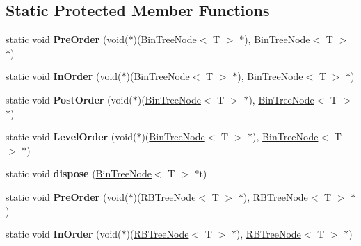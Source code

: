 \subsection*{Static Protected Member Functions}
\begin{DoxyCompactItemize}
\item 
\mbox{\label{classLinkedBinaryTree_afe666629aa48b0b728d3868a604a4edd}} 
static void {\bfseries Pre\+Order} (void($\ast$)(\hyperlink{structBinTreeNode}{Bin\+Tree\+Node}$<$ T $>$ $\ast$), \hyperlink{structBinTreeNode}{Bin\+Tree\+Node}$<$ T $>$ $\ast$)
\item 
\mbox{\label{classLinkedBinaryTree_aad48962cf15c42729050432724c84f7d}} 
static void {\bfseries In\+Order} (void($\ast$)(\hyperlink{structBinTreeNode}{Bin\+Tree\+Node}$<$ T $>$ $\ast$), \hyperlink{structBinTreeNode}{Bin\+Tree\+Node}$<$ T $>$ $\ast$)
\item 
\mbox{\label{classLinkedBinaryTree_ae68892b9b41f1319cdce9be8960cdb25}} 
static void {\bfseries Post\+Order} (void($\ast$)(\hyperlink{structBinTreeNode}{Bin\+Tree\+Node}$<$ T $>$ $\ast$), \hyperlink{structBinTreeNode}{Bin\+Tree\+Node}$<$ T $>$ $\ast$)
\item 
\mbox{\label{classLinkedBinaryTree_a167c6b7159236f1d143e4a7bf8cd2548}} 
static void {\bfseries Level\+Order} (void($\ast$)(\hyperlink{structBinTreeNode}{Bin\+Tree\+Node}$<$ T $>$ $\ast$), \hyperlink{structBinTreeNode}{Bin\+Tree\+Node}$<$ T $>$ $\ast$)
\item 
\mbox{\label{classLinkedBinaryTree_a36208322e76b320845daec80bcca1329}} 
static void {\bfseries dispose} (\hyperlink{structBinTreeNode}{Bin\+Tree\+Node}$<$ T $>$ $\ast$t)
\item 
\mbox{\label{classLinkedBinaryTree_a7300c67c37dccb1367140fced2f27f06}} 
static void {\bfseries Pre\+Order} (void($\ast$)(\hyperlink{structRBTreeNode}{R\+B\+Tree\+Node}$<$ T $>$ $\ast$), \hyperlink{structRBTreeNode}{R\+B\+Tree\+Node}$<$ T $>$ $\ast$)
\item 
\mbox{\label{classLinkedBinaryTree_a0f955322253ff7afd4bd572302b47944}} 
static void {\bfseries In\+Order} (void($\ast$)(\hyperlink{structRBTreeNode}{R\+B\+Tree\+Node}$<$ T $>$ $\ast$), \hyperlink{structRBTreeNode}{R\+B\+Tree\+Node}$<$ T $>$ $\ast$)

\end{DoxyCompactItemize}
